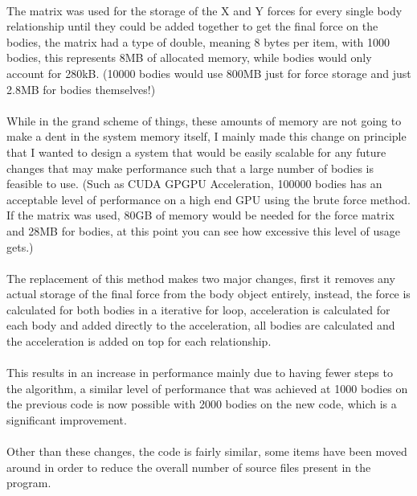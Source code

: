 \paragraph{}
The matrix was used for the storage of the X and Y forces for every single body relationship until they could be added together to get the final force on the bodies, the matrix had a type of double, meaning 8 bytes per item, with 1000 bodies, this represents 8MB of allocated memory, while bodies would only account for 280kB. (10000 bodies would use 800MB just for force storage and just 2.8MB for bodies themselves!)

\paragraph{}
While in the grand scheme of things, these amounts of memory are not going to make a dent in the system memory itself, I mainly made this change on principle that I wanted to design a system that would be easily scalable for any future changes that may make performance such that a large number of bodies is feasible to use. (Such as CUDA GPGPU Acceleration, 100000 bodies has an acceptable level of performance on a high end GPU using the brute force method. If the matrix was used, 80GB of memory would be needed for the force matrix and 28MB for bodies, at this point you can see how excessive this level of usage gets.)

\paragraph{}
The replacement of this method makes two major changes, first it removes any actual storage of the final force from the body object entirely, instead, the force is calculated for both bodies in a iterative for loop, acceleration is calculated for each body and added directly to the acceleration, all bodies are calculated and the acceleration is added on top for each relationship.

\paragraph{}
This results in an increase in performance mainly due to having fewer steps to the algorithm, a similar level of performance that was achieved at 1000 bodies on the previous code is now possible with 2000 bodies on the new code, which is a significant improvement.

\paragraph{}
Other than these changes, the code is fairly similar, some items have been moved around in order to reduce the overall number of source files present in the program.

